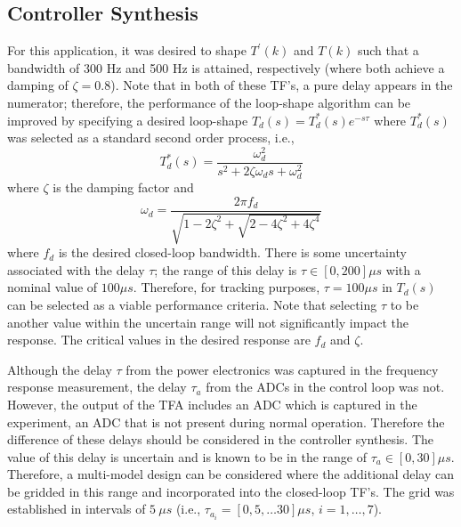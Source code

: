 \documentclass[a4paper, 10pt, conference]{ieeeconf}
\begin{document}
\subsection{Controller Synthesis}
For this application, it was desired to shape $T^{\prime}(k)$ and $T(k)$ such that a bandwidth of 300 Hz and 500 Hz is attained, respectively (where both achieve a damping of $\zeta = 0.8$). Note that in both of these TF's, a pure delay appears in the numerator; therefore, the performance of the loop-shape algorithm can be improved by specifying a desired loop-shape $T_d(s) = T_d^*(s) e^{-s\tau}$ where $T_d^*(s)$ was selected as a standard second order process, i.e.,
\begin{equation}
T_d^*(s) = \frac{\omega_d^2}{s^2 + 2\zeta \omega_d s + \omega_d^2}
\end{equation}
where $\zeta$ is the damping factor and
\begin{equation*}
\omega_d = \frac{2 \pi f_d}{\sqrt{1-2\zeta^2 + \sqrt{2-4\zeta^2 + 4\zeta^4}}}
\end{equation*}
where $f_d$ is the desired closed-loop bandwidth. There is some uncertainty associated with the delay $\tau$; the range of this delay is $\tau \in [0,200]\mu s$ with a nominal value of $100 \mu s$. Therefore, for tracking purposes, $\tau = 100 \mu s$ in $T_d(s)$ can be selected as a viable performance criteria. Note that selecting $\tau$ to be another value within the uncertain range will not significantly impact the response. The critical values in the desired response are $f_d$ and $\zeta$. 

Although the delay $\tau$ from the power electronics was captured in the frequency response measurement, the delay $\tau_{a}$ from the ADCs in the control loop was not. However, the output of the TFA includes an ADC which is captured in the experiment, an ADC that is not present during normal operation. Therefore the difference of these delays should be considered in the controller synthesis. The value of this delay is uncertain and is known to be in the range of $\tau_{a} \in [0,30]\mu s$. Therefore, a multi-model design can be considered where the additional delay can be gridded in this range and incorporated into the closed-loop TF's. The grid was established in intervals of $5 \: \mu s$ (i.e., $\tau_{a_i} = [0,5,\ldots30] \mu s$, $i = 1,\ldots,7$).  
\end{document}
